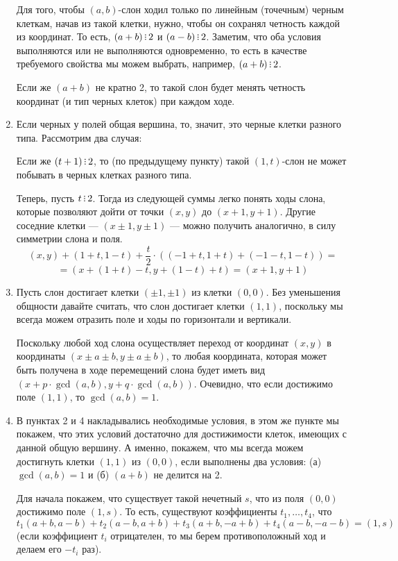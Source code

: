 \begin{enumerate}
Для того, чтобы $(a,b)$-слон ходил только по линейным (точечным)
черным клеткам, начав из такой клетки, нужно, чтобы он сохранял четность 
каждой из координат.
То есть, $(a+b) \divsby 2$ и $(a-b) \divsby 2$. Заметим, что оба условия
выполняются или не выполняются одновременно, то есть в качестве требуемого
свойства мы можем выбрать, например, $(a+b) \divsby 2$.

Если же $(a+b)$ не кратно 2, то такой слон будет менять четность координат
(и тип черных клеток) при каждом ходе.

\item Если черных у полей общая вершина, то, значит, это черные клетки разного
типа. Рассмотрим два случая:

Если же $(t+1) \divsby 2$, то (по предыдущему пункту) такой $(1,t)$-слон 
не может побывать в черных клетках разного типа. 

Теперь, пусть $t \divsby 2$. Тогда из следующей суммы легко понять ходы слона,
которые позволяют дойти от точки $(x,y)$ до $(x+1,y+1)$. Другие соседние клетки ---
$(x \pm 1, y \pm 1)$ --- можно получить аналогично, в силу симметрии слона и 
поля.
$$(x,y) + (1+t,1-t) + \frac{t}{2} \cdot ((-1+t,1+t) + (-1-t,1-t)) =$$
$$= (x+(1+t)-t, y+(1-t)+t) = (x+1,y+1)$$

\item Пусть слон достигает клетки $(\pm 1,\pm 1)$ из клетки $(0,0)$.
Без уменьшения общности давайте считать, что слон достигает клетки $(1,1)$, 
поскольку мы всегда можем отразить поле и ходы по горизонтали и вертикали.

Поскольку любой ход
слона осуществляет переход от координат $(x,y)$ в координаты 
$(x \pm a \pm b, y \pm a \pm b)$, то любая координата, которая может быть получена
в ходе перемещений слона будет иметь вид $(x + p\cdot\gcd(a,b), y + q\cdot\gcd(a,b))$.
Очевидно, что если достижимо поле $(1,1)$, то $\gcd(a,b) = 1$.

\item В пунктах 2 и 4 накладывались необходимые условия, в этом же пункте
мы покажем, что этих условий достаточно для достижимости клеток, имеющих с данной
общую вершину. А именно, покажем, что мы всегда можем достигнуть клетки 
$(1,1)$ из $(0,0)$, если выполнены два условия: (а) $\gcd(a,b)=1$ и (б) $(a+b)$ 
не делится на 2.

Для начала покажем, что существует такой нечетный $s$, что из поля $(0,0)$ 
достижимо поле $(1,s)$.
То есть, существуют коэффициенты $t_1, \ldots, t_4$, что 
$$t_1 (a+b,a-b) + t_2 (a-b,a+b) + t_3 (a+b,-a+b) + t_4 (a-b,-a-b) = (1,s)$$
(если коэффициент $t_i$ отрицателен, то мы берем противоположный ход и делаем
его $-t_i$ раз).


\end{enumerate}
